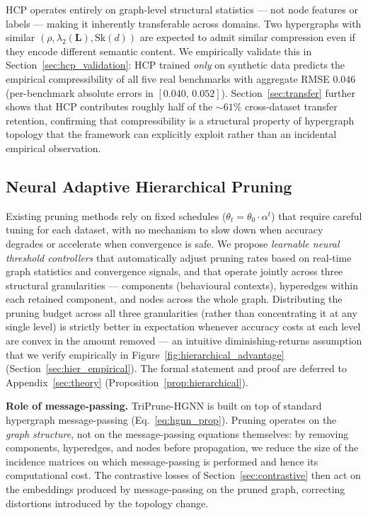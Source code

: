 \documentclass[10pt]{article}
\theoremstyle{plain}
\theoremstyle{definition}
\begin{document}
HCP operates entirely on graph-level structural statistics --- not node features or labels --- making it inherently transferable across domains. Two hypergraphs with similar $(\rho,\lambda_2(\mathbf{L}),\mathrm{Sk}(d))$ are expected  to admit similar compression even if they encode different semantic content. We empirically validate this in Section~\ref{sec:hcp_validation}: HCP trained \emph{only} on synthetic data predicts the empirical compressibility of all five real benchmarks with aggregate RMSE $0.046$ (per-benchmark absolute errors in $[0.040,\,0.052]$). Section~\ref{sec:transfer} further shows that HCP contributes roughly half of the $\sim\!61\%$ cross-dataset transfer retention, confirming that compressibility is a structural property of hypergraph topology that the framework can explicitly exploit rather than an incidental empirical observation.
\subsection{Neural Adaptive Hierarchical Pruning}
\label{sec:nahp}

Existing pruning methods rely on fixed schedules ($\theta_t = \theta_0\cdot\alpha^{t}$) that require careful tuning for each dataset, with no mechanism to slow down when accuracy degrades or accelerate when convergence is safe. We propose \emph{learnable neural threshold controllers} that automatically adjust pruning rates based on real-time graph statistics and convergence signals, and that operate jointly across three structural granularities --- components (behavioural contexts), hyperedges within each retained component, and nodes across the whole graph. Distributing the pruning budget across all three granularities (rather than concentrating it at any single level) is strictly better in expectation whenever accuracy costs at each level are convex in the amount removed --- an intuitive diminishing-returns assumption that we verify empirically in Figure~\ref{fig:hierarchical_advantage} (Section~\ref{sec:hier_empirical}). The formal statement and proof are deferred to Appendix~\ref{sec:theory} (Proposition~\ref{prop:hierarchical}).

\textbf{Role of message-passing.} TriPrune-HGNN is built on top of standard hypergraph message-passing (Eq.~\eqref{eq:hgnn_prop}). Pruning operates on the \emph{graph structure}, not on the message-passing equations themselves: by removing components, hyperedges, and nodes before propagation, we reduce the size of the incidence matrices on which message-passing is performed and hence its computational cost. The contrastive losses of Section~\ref{sec:contrastive} then act on the embeddings produced by message-passing on the pruned graph, correcting distortions introduced by the topology change.
\end{document}
